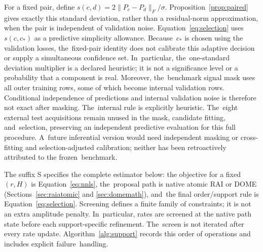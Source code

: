 \documentclass[mathematics,article,accept,moreauthors]{Definitions/mdpi}
\begin{document}
For a fixed pair, define $s(c,d)=2\|P_c-P_d\|_F/\sigma$. Proposition~\ref{prop:paired} gives exactly this standard deviation, rather than a residual-norm approximation, when the pair is independent of validation noise. Equation~\eqref{eq:selection} uses $s(c,c_*)$ as a predictive simplicity allowance. Because~$c_*$ is chosen using the validation losses, the~fixed-pair identity does not calibrate this adaptive decision or supply a simultaneous confidence set. In~particular, the~one-standard deviation multiplier is a declared heuristic; it is not a significance level or a probability that a component is real. Moreover, the~benchmark signal mask uses all outer training rows, some of which become internal validation rows. Conditional independence of predictions and internal validation noise is therefore not exact after masking. The~internal rule is explicitly heuristic. The~eight external test acquisitions remain unused in the mask, candidate fitting, and~selection, preserving an independent predictive evaluation for this full procedure. A~future inferential version would need independent masking or cross-fitting and selection-adjusted calibration; neither has been retroactively attributed to the frozen~benchmark.

The suffix S specifies the complete estimator below: the objective for a fixed $(r,H)$ is Equation~\eqref{eq:nnls}, the~proposal path is native atomic RAI or DOME (Sections~\ref{sec:raiatomic} and \ref{sec:domemath}), and~the final order/support rule is Equation~\eqref{eq:selection}. Screening defines a finite family of constraints; it is not an extra amplitude penalty. In~particular, rates are screened at the native path state before each support-specific refinement. The~screen is not iterated after every rate update. Algorithm~\ref{alg:support} records this order of operations and includes explicit failure~handling.
\end{document}
